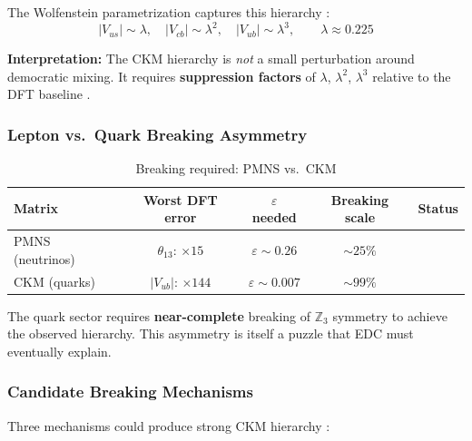 The Wolfenstein parametrization captures this hierarchy \tagBL{}:
\begin{equation}
    |V_{us}| \sim \lambda, \quad
    |V_{cb}| \sim \lambda^2, \quad
    |V_{ub}| \sim \lambda^3, \qquad
    \lambda \approx 0.225
    \label{eq:ch7_wolfenstein}
\end{equation}

\textbf{Interpretation:} The CKM hierarchy is \emph{not} a small perturbation
around democratic mixing. It requires \textbf{suppression factors} of $\lambda$,
$\lambda^2$, $\lambda^3$ relative to the DFT baseline \tagDc{}.

\subsubsection{Lepton vs.\ Quark Breaking Asymmetry}

\begin{table}[ht]
\centering
\caption{Breaking required: PMNS vs.\ CKM}
\label{tab:ch7_breaking_comparison}
\begin{tabular}{lcccc}
\toprule
\textbf{Matrix} & \textbf{Worst DFT error} & \textbf{$\varepsilon$ needed} & \textbf{Breaking scale} & \textbf{Status} \\
\midrule
PMNS (neutrinos) & $\theta_{13}$: $\times 15$ & $\varepsilon \sim 0.26$ & $\sim 25\%$ & \tagI{} \\
CKM (quarks) & $|V_{ub}|$: $\times 144$ & $\varepsilon \sim 0.007$ & $\sim 99\%$ & \tagI{} \\
\bottomrule
\end{tabular}
\end{table}

The quark sector requires \textbf{near-complete} breaking of $\mathbb{Z}_3$
symmetry to achieve the observed hierarchy. This asymmetry is itself a puzzle
that EDC must eventually explain.

\subsubsection{Candidate Breaking Mechanisms}

Three mechanisms could produce strong CKM hierarchy \tagP{}:

